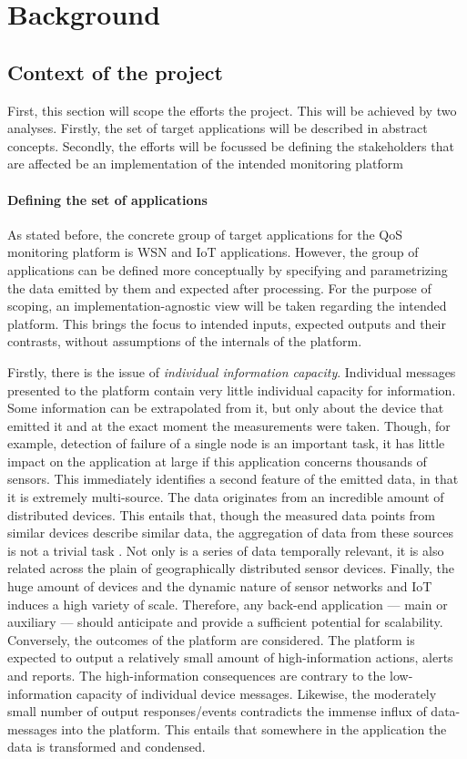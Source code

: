 \chapter{Background}
\label{ch:back}
\section{Context of the project}
\label{sec:back:context}
First, this section will scope the efforts the project. This will be achieved by two analyses. Firstly, the set of target applications will be described in abstract concepts. Secondly, the efforts will be focussed  be defining the stakeholders that are affected be an implementation of the intended monitoring platform

\subsubsection*{Defining the set of applications}
As stated before, the concrete group of target applications for the QoS monitoring platform is WSN and IoT applications. However, the group of applications can be defined more conceptually by specifying and parametrizing the data emitted by them and expected after processing. For the purpose of scoping, an implementation-agnostic view will be taken regarding the intended platform. This brings the focus to intended inputs, expected outputs and their contrasts, without assumptions of the internals of the platform.

Firstly, there is the issue of \emph{individual information capacity}. Individual messages presented to the platform contain very little individual capacity for information. Some information can be extrapolated from it, but only about the device that emitted it and at the exact moment the measurements were taken. Though, for example, detection of failure of a single node is an important task, it has little impact on the application at large if this application concerns thousands of sensors. This immediately identifies a second feature of the emitted data, in that it is extremely multi-source. The data originates from an incredible amount of distributed devices. This entails that, though the measured data points from similar devices describe similar data, the aggregation of data from these sources is not a trivial task \cite{iot_big_data_difficulties}. Not only is a series of data temporally relevant, it is also related across the plain of geographically distributed sensor devices. Finally, the huge amount of devices and the dynamic nature of sensor networks and IoT induces a high variety of scale. Therefore, any back-end application --- main or auxiliary --- should anticipate and provide a sufficient potential for scalability. Conversely, the outcomes of the platform are considered. The platform is expected to output a relatively small amount of high-information actions, alerts and reports. The high-information consequences are contrary to the low-information capacity of individual device messages. Likewise, the moderately small number of output responses/events contradicts the immense influx of data-messages into the platform. This entails that somewhere in the application the data is transformed and condensed.

